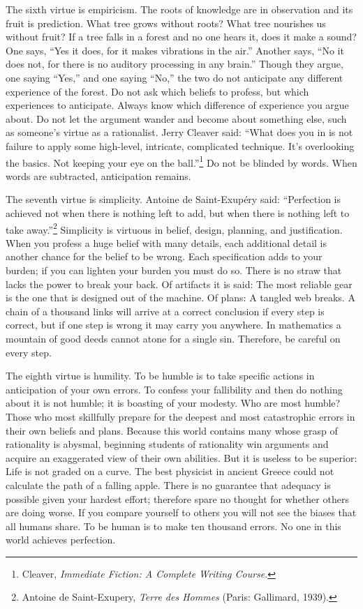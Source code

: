 {
 The sixth virtue is empiricism. The roots of knowledge are in
observation and its fruit is prediction. What tree grows without roots?
What tree nourishes us without fruit? If a tree falls in a forest and
no one hears it, does it make a sound? One says, ``Yes
it does, for it makes vibrations in the air.''
Another says, ``No it does not, for there is no
auditory processing in any brain.'' Though they
argue, one saying ``Yes,'' and one
saying ``No,'' the two do not
anticipate any different experience of the forest. Do not ask which
beliefs to profess, but which experiences to anticipate. Always know
which difference of experience you argue about. Do not let the argument
wander and become about something else, such as
someone's virtue as a rationalist. Jerry Cleaver said:
``What does you in is not failure to apply some
high-level, intricate, complicated technique. It's
overlooking the basics. Not keeping your eye on the
ball.''\footnote{Cleaver, \textit{Immediate Fiction: A Complete Writing
Course}.} Do not be blinded by
words. When words are subtracted, anticipation remains.}

\label{seventh_virtue}
{
 The seventh virtue is simplicity. Antoine de Saint-Exupéry said:
``Perfection is achieved not when there is nothing
left to add, but when there is nothing left to take
away.''\footnote{Antoine de Saint-Exupery, \textit{Terre des Hommes} (Paris:
Gallimard, 1939).} Simplicity is virtuous in
belief, design, planning, and justification. When you profess a huge
belief with many details, each additional detail is another chance for
the belief to be wrong. Each specification adds to your burden; if you
can lighten your burden you must do so. There is no straw that lacks
the power to break your back. Of artifacts it is said: The most
reliable gear is the one that is designed out of the machine. Of plans:
A tangled web breaks. A chain of a thousand links will arrive at a
correct conclusion if every step is correct, but if one step is wrong
it may carry you anywhere. In mathematics a mountain of good deeds
cannot atone for a single sin. Therefore, be careful on every step.}

{
 The eighth virtue is humility. To be humble is to take specific
actions in anticipation of your own errors. To confess your fallibility
and then do nothing about it is not humble; it is boasting of your
modesty. Who are most humble? Those who most skillfully prepare for the
deepest and most catastrophic errors in their own beliefs and plans.
Because this world contains many whose grasp of rationality is abysmal,
beginning students of rationality win arguments and acquire an
exaggerated view of their own abilities. But it is useless to be
superior: Life is not graded on a curve. The best physicist in ancient
Greece could not calculate the path of a falling apple. There is no
guarantee that adequacy is possible given your hardest effort;
therefore spare no thought for whether others are doing worse. If you
compare yourself to others you will not see the biases that all humans
share. To be human is to make ten thousand errors. No one in this world
achieves perfection.}

